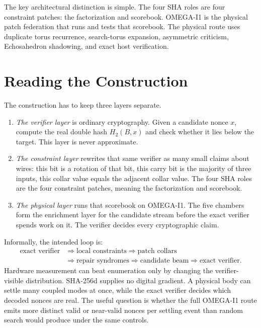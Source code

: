 \documentclass[11pt]{article}
\theoremstyle{definition}
\theoremstyle{remark}
\begin{document}
The key architectural distinction is simple. The four SHA roles are four
constraint patches: the factorization and scorebook. OMEGA-I1 is the physical patch
federation that runs and tests that scorebook. The physical route uses duplicate
torus recurrence, search-torus expansion, asymmetric criticism, Echosahedron
shadowing, and exact host verification.

\section{Reading the Construction}

The construction has to keep three layers separate.

\begin{enumerate}
\item \emph{The verifier layer} is ordinary cryptography. Given a candidate
nonce \(x\), compute the real double hash \(H_2(B,x)\) and check whether it lies
below the target. This layer is never approximate.
\item \emph{The constraint layer} rewrites that same verifier as many small
claims about wires: this bit is a rotation of that bit, this carry bit is the
majority of three inputs, this collar value equals the adjacent collar value.
The four SHA roles are the four constraint patches, meaning the factorization
and scorebook.
\item \emph{The physical layer} runs that scorebook on OMEGA-I1. The five
chambers form the enrichment layer for the candidate stream before the exact
verifier spends work on it. The verifier decides every cryptographic claim.
\end{enumerate}

Informally, the intended loop is:
\[
\begin{aligned}
\text{exact verifier}
&\Rightarrow
\text{local constraints}
\Rightarrow
\text{patch collars}\\
&\Rightarrow
\text{repair syndromes}
\Rightarrow
\text{candidate beam}
\Rightarrow
\text{exact verifier}.
\end{aligned}
\]
Hardware measurement can beat enumeration only by changing the
verifier-visible distribution. SHA-256d supplies no digital gradient. A physical
body can settle many coupled modes at once, while the exact verifier decides
which decoded nonces are real. The useful question is whether the full OMEGA-I1
route emits more distinct valid or near-valid nonces per settling event than
random search would produce under the same controls.
\end{document}
